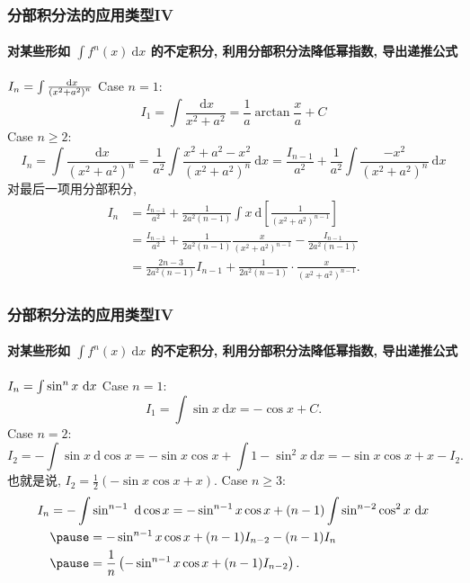 \documentclass[
10pt,
aspectratio=43,
]{beamer}
\begin{document}
\begin{frame}
	\frametitle{分部积分法的应用类型IV}
	\framesubtitle{对某些形如 $\int f^n(x) \mathrm{~d} x$ 的不定积分, 利用分部积分法降低幂指数, 导出递推公式}
	\everymath{\displaystyle}
	{\small
		\begin{exampleblock}{$\color{black}I_n=\int \frac{\mathrm{~d} x}{\left(x^2+a^2\right)^n}$}
			\pause Case $n=1$:\pause
			$$
				I_1=\int \frac{\mathrm{~d} x}{x^2+a^2}=\frac{1}{a} \arctan \frac{x}{a}+C
			$$
			\pause Case $n\ge2$:\pause
			$$
				I_n=\int \frac{\mathrm{~d} x}{\left(x^2+a^2\right)^n}=\frac{1}{a^2} \int \frac{x^2+a^2-x^2}{\left(x^2+a^2\right)^n} \mathrm{~d} x=\frac{I_{n-1}}{a^2}+\frac{1}{a^2} \int \frac{-x^2}{\left(x^2+a^2\right)^n} \mathrm{~d} x
			$$
			\pause 对最后一项用分部积分,\pause
			$$
				\begin{aligned}
					I_n & =\frac{I_{n-1}}{a^2}+\frac{1}{2 a^2(n-1)} \int x \mathrm{~d}\left[\frac{1}{\left(x^2+a^2\right)^{n-1}}\right] \\
					    & =\frac{I_{n-1}}{a^2}+\frac{1}{2 a^2(n-1)} \frac{x}{\left(x^2+a^2\right)^{n-1}}-\frac{I_{n-1}}{2 a^2(n-1)}     \\
					    & =\frac{2 n-3}{2 a^2(n-1)} I_{n-1}+\frac{1}{2 a^2(n-1)} \cdot \frac{x}{\left(x^2+a^2\right)^{n-1}}.
				\end{aligned}
			$$
		\end{exampleblock}
	}
\end{frame}

\begin{frame}
	\frametitle{分部积分法的应用类型IV}
	\framesubtitle{对某些形如 $\int f^n(x) \mathrm{~d} x$ 的不定积分, 利用分部积分法降低幂指数, 导出递推公式}
	\everymath{\displaystyle}
	{\small
		\begin{exampleblock}{$\color{black}I_n=\int \sin^n x\mathrm{~d} x$}
			\pause Case $n=1$:\pause
			$$
				I_1=\int \sin x\mathrm{~d}x = -\cos x+C.
			$$
			\pause Case $n=2$:\pause
			$$
				I_2=-\int\sin x\mathrm{~d}\cos x =-\sin x\cos x+ \int 1-\sin^2x\mathrm{~d}x=-\sin x\cos x+x -I_2.
			$$
			\pause 也就是说, $I_2=\frac{1}{2}\left(-\sin x\cos x +x\right)$. \pause Case $n\ge3$:\pause
			$$
				\begin{aligned}
					I_n & =-\int\sin ^{n-1}\mathrm{~d}\cos x  =-\sin^{n-1}x\cos x+(n-1)\int \sin^{n-2}\cos^2x\mathrm{~d}x \\
					    & \pause =-\sin^{n-1}x\cos x+(n-1)I_{n-2}-(n-1)I_{n}                                              \\
					    & \pause =\frac{1}{n}\left(-\sin^{n-1}x\cos x +(n-1)I_{n-2}\right).
				\end{aligned}
			$$
		\end{exampleblock}
	}
\end{frame}
\end{document}
